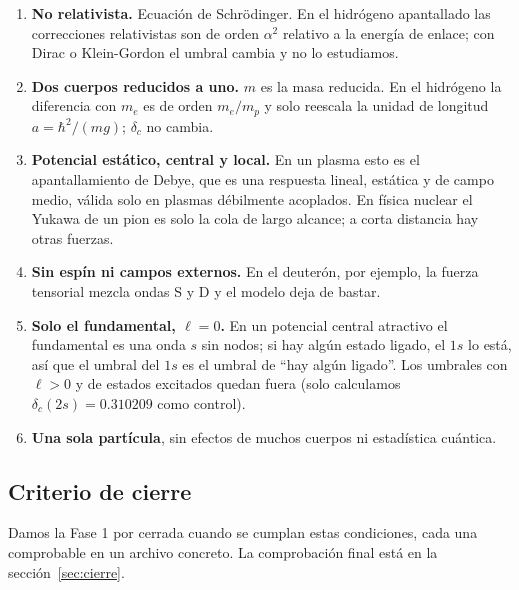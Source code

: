 \documentclass[11pt]{article}
\newcommand{\dc}{\delta_c}
\begin{document}
\begin{enumerate}
\item \textbf{No relativista.} Ecuación de Schrödinger. En el hidrógeno apantallado las correcciones relativistas son de orden $\alpha^2$ relativo a la energía de enlace; con Dirac o Klein-Gordon el umbral cambia y no lo estudiamos.
\item \textbf{Dos cuerpos reducidos a uno.} $m$ es la masa reducida. En el hidrógeno la diferencia con $m_e$ es de orden $m_e/m_p$ y solo reescala la unidad de longitud $a=\hbar^2/(mg)$; $\dc$ no cambia.
\item \textbf{Potencial estático, central y local.} En un plasma esto es el apantallamiento de Debye, que es una respuesta lineal, estática y de campo medio, válida solo en plasmas débilmente acoplados. En física nuclear el Yukawa de un pion es solo la cola de largo alcance; a corta distancia hay otras fuerzas.
\item \textbf{Sin espín ni campos externos.} En el deuterón, por ejemplo, la fuerza tensorial mezcla ondas S y D y el modelo deja de bastar.
\item \textbf{Solo el fundamental, $\ell=0$.} En un potencial central atractivo el fundamental es una onda $s$ sin nodos; si hay algún estado ligado, el $1s$ lo está, así que el umbral del $1s$ es el umbral de ``hay algún ligado''. Los umbrales con $\ell>0$ y de estados excitados quedan fuera (solo calculamos $\dc(2s)=0.310209$ como control).
\item \textbf{Una sola partícula}, sin efectos de muchos cuerpos ni estadística cuántica.
\end{enumerate}

\subsection{Criterio de cierre}

Damos la Fase 1 por cerrada cuando se cumplan estas condiciones, cada una comprobable en un archivo concreto. La comprobación final está en la sección~\ref{sec:cierre}.
\end{document}

